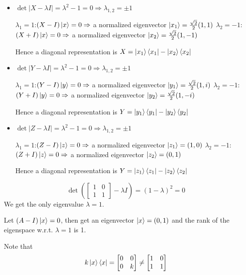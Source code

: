\documentclass{homeworg}
\begin{document}
\exercise*
\begin{itemize}
    \item $\det|X-\lambda I|=\lambda^2-1=0\Rightarrow\lambda_{1,2}=\pm1$
    
        \subitem $\lambda_1=1$:\quad$(X-I)\ket{x}=0\Rightarrow$ a normalized eigenvector $\ket{x_1}=\frac{\sqrt{2}}{2}(1,1)$
        \subitem $\lambda_2=-1$:\;\;$(X+I)\ket{x}=0\Rightarrow$ a normalized eigenvector $\ket{x_2}=\frac{\sqrt{2}}{2}(1,-1)$
        
    Hence a diagonal representation is $X=\ket{x_1}\bra{x_1} - \ket{x_2}\bra{x_2}$
    \item $\det|Y-\lambda I|=\lambda^2-1=0\Rightarrow\lambda_{1,2}=\pm 1$
    
        \subitem $\lambda_1=1$:\quad$(Y-I)\ket{y}=0\Rightarrow$ a normalized eigenvector $\ket{y_1}=\frac{\sqrt{2}}{2}(1,i)$
        \subitem $\lambda_2=-1$:\;\;$(Y+I)\ket{y}=0\Rightarrow$ a normalized eigenvector $\ket{y_2}=\frac{\sqrt{2}}{2}(1,-i)$
        
    Hence a diagonal representation is $Y=\ket{y_1}\bra{y_1} - \ket{y_2}\bra{y_2}$
    \item $\det|Z-\lambda I|=\lambda^2-1=0\Rightarrow\lambda_{1,2}=\pm 1$
    
        \subitem $\lambda_1=1$:\quad$(Z-I)\ket{z}=0\Rightarrow$ a normalized eigenvector $\ket{z_1}=(1,0)$
        \subitem $\lambda_2=-1$:\;\;$(Z+I)\ket{z}=0\Rightarrow$ a normalized eigenvector $\ket{z_2}=(0,1)$
        
    Hence a diagonal representation is $Y=\ket{z_1}\bra{z_1} - \ket{z_2}\bra{z_2}$
\end{itemize}

\exercise*
\[\det (\begin{bmatrix} 1 & 0 \\ 1 & 1 \end{bmatrix}-\lambda I)=(1-\lambda)^2=0\]
We get the only eigenvalue $\lambda=1$.

Let $(A-I)\ket{x}=0$, then get an eigenvector $\ket{x}=(0,1)$ and the rank of the eigenspace w.r.t. $\lambda=1$ is 1.

Note that
\[k\ket{x}\bra{x}=\begin{bmatrix} 0 & 0 \\ 0 & k \end{bmatrix}\neq\begin{bmatrix} 1 & 0 \\ 1 & 1 \end{bmatrix}\]
\end{document}
